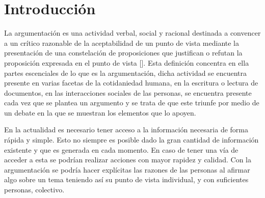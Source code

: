 \chapter*{Introducción}\label{chapter:introduction}


La argumentación es una actividad verbal, social y racional destinada a convencer 
a un crítico razonable de la aceptabilidad de un punto de vista mediante la presentación 
de una constelación de proposiciones que justifican o refutan la proposición expresada 
en el punto de vista [\cite{van2004systematic}]. Esta definición concentra en ella 
partes escenciales de lo que es la argumentación, dicha actividad se encuentra presente
en varias facetas de la cotidaniedad humana, en la escritura o lectura de documentos,
en las interacciones sociales de las personas, se encuentra presente cada vez que se
plantea un argumento y se trata de que este triunfe por medio de un debate en la que 
se muestran los elementos que lo apoyen.   

En la actualidad es necesario tener acceso a la información necesaria
de forma rápida y simple. Esto no siempre es posible dado la gran cantidad de información existente y
que es generada en cada momento. En caso de tener una vía de acceder a esta se podrían realizar acciones
con mayor rapidez y calidad. Con la argumentación se podría hacer explícitas las razones de las personas 
al afirmar algo sobre un tema teniendo así su punto de vista individual, y con suficientes personas, colectivo.



